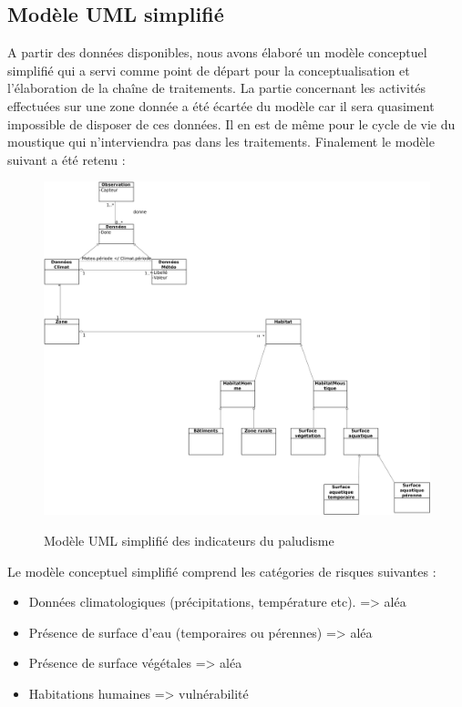 \subsection{Modèle UML simplifié}

A partir des données disponibles, nous avons élaboré un modèle conceptuel simplifié qui a servi comme point de départ pour la conceptualisation et l'élaboration de la chaîne de traitements. La partie concernant les activités effectuées sur une zone donnée a été écartée du modèle car il sera quasiment impossible de disposer de ces données. Il en est de même pour le cycle de vie du moustique qui n'interviendra pas dans les traitements.
Finalement le modèle suivant a été retenu :

\begin{center}
\begin{figure}[h] \centering
\includegraphics[width=14cm]{DiagrammeUMLsimplif.png}\\
\caption{\label{UMLSimplif_malaria} Modèle UML simplifié des indicateurs du paludisme}
\end{figure}
\end{center}

Le modèle conceptuel simplifié comprend les catégories de risques suivantes : \\
\begin{itemize}
\item Données climatologiques (précipitations, température etc). => aléa
\item Présence de surface d'eau (temporaires ou pérennes) => aléa
\item Présence de surface végétales => aléa
\item Habitations humaines => vulnérabilité\\
\end{itemize}


